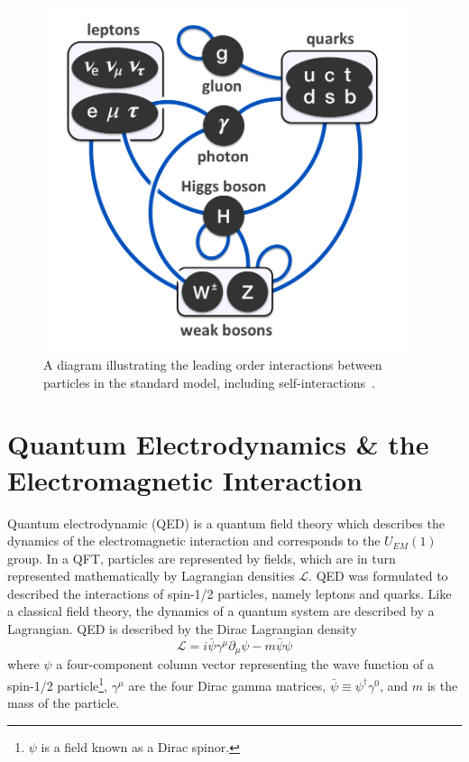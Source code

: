 \begin{figure}[!hbt]
	\begin{center}
		\includegraphics[width=0.95\textwidth]{figures/Chapter2/Elementary_particle_interactions_in_the_Standard_Model.png}
		\caption{A diagram illustrating the leading order interactions between particles in the standard model, including self-interactions~\cite{Drexler}.}
		\label{fig:sm-interactions}
	\end{center}
\end{figure}

\section{Quantum Electrodynamics \& the Electromagnetic Interaction}
\label{sec:QED}

Quantum electrodynamic (QED) is a quantum field theory which describes the dynamics of the electromagnetic interaction and corresponds to the $U_{EM}\left(1\right)$ group.
In a QFT, particles are represented by fields, which are in turn represented mathematically by Lagrangian densities $\mathcal{L}$.
QED was formulated to described the interactions of spin-1/2 particles, namely leptons and quarks.
Like a classical field theory, the dynamics of a quantum system are described by a Lagrangian.
QED is described by the Dirac Lagrangian density
\begin{equation}\label{eq:dirac_lagrangian_density}
\mathcal{L}=i\bar{\psi}\gamma^{\mu}\partial_{\mu}\psi-m\bar{\psi}\psi
\end{equation}
where $\psi$ a four-component column vector representing the wave function of a spin-1/2 particle\footnote{$\psi$ is a field known as a Dirac spinor.}, $\gamma^{\mu}$ are the four Dirac gamma matrices, $\bar{\psi}\equiv\psi^{\dagger}\gamma^{0}$, and $m$ is the mass of the particle.

